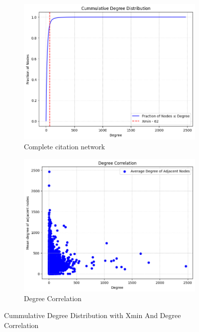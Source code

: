 \documentclass{article}
\begin{document}
\begin{figure}[h]
\centering
\begin{subfigure}[b]{0.40\textwidth}
    \centering
    \includegraphics[width=\textwidth]{Figures/Cummulative Degree Distribution.png}
    \caption{Complete citation network}
    \label{fig:network_graph}
\end{subfigure}
\hfill
\begin{subfigure}[b]{0.40\textwidth}
    \centering
    \includegraphics[width=\textwidth]{Figures/Degree Correlation}
    \caption{Degree Correlation}
    \label{fig:sample_network}
\end{subfigure}
\caption{Cummulative Degree Distribution with Xmin And Degree Correlation }
\label{fig:combined}
\end{figure}
\end{document}
